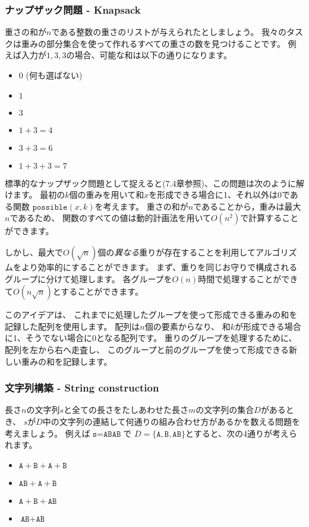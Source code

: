 \subsubsection{ナップザック問題 - Knapsack}

重さの和が$n$である整数の重さのリストが与えられたとしましょう。
我々のタスクは重みの部分集合を使って作れるすべての重さの数を見つけることです。
例えば入力が${1, 3, 3}$の場合、可能な和は以下の通りになります。

\begin{itemize}[noitemsep]
\item $0$ (何も選ばない)
\item $1$
\item $3$
\item $1+3=4$
\item $3+3=6$
\item $1+3+3=7$
\end{itemize}

標準的なナップザック問題として捉えると(7.4章参照)、この問題は次のように解けます。
最初の$k$個の重みを用いて和$x$を形成できる場合に1、それ以外は0である関数
$\texttt{possible}(x,k)$を考えます。
重さの和が$n$であることから，重みは最大$n$であるため、
関数のすべての値は動的計画法を用いて$O(n^2)$で計算することができます。

しかし、最大で$O(\sqrt n)$個の\emph{異なる}重りが存在することを利用してアルゴリズムをより効率的にすることができます。
まず、重りを同じお守りで構成されるグループに分けて処理します。
各グループを$O(n)$時間で処理することができて$O(n \sqrt n)$とすることができます。

このアイデアは、
これまでに処理したグループを使って形成できる重みの和を記録した配列を使用します。
配列は$n$個の要素からなり、
和$k$が形成できる場合に1、そうでない場合に0となる配列です。
重りのグループを処理するために、配列を左から右へ走査し、
このグループと前のグループを使って形成できる新しい重みの和を記録します。

\subsubsection{文字列構築 - String construction}

長さ$n$の文字列$s$と全ての長さをたしあわせた長さ$m$の文字列の集合$D$があるとき、
$s$が$D$中の文字列の連結して何通りの組み合わせ方があるかを数える問題を考えましょう。
例えば$\texttt{s}=\texttt{ABAB}$で
$D=\{\texttt{A},\texttt{B},\texttt{AB}\}$とすると、次の4通りが考えられます。

\begin{itemize}[noitemsep]
\item $\texttt{A}+\texttt{B}+\texttt{A}+\texttt{B}$
\item $\texttt{AB}+\texttt{A}+\texttt{B}$
\item $\texttt{A}+\texttt{B}+\texttt{AB}$
\item $\texttt{AB}+\texttt{AB}$
\end{itemize}

